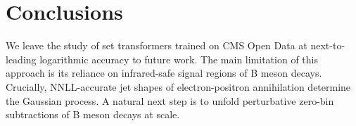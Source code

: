 \section{Conclusions}\label{sec:conclusions}

We leave the study of set transformers trained on CMS Open Data at
next-to-leading logarithmic accuracy to future work. The main limitation
of this approach is its reliance on infrared-safe signal regions of B
meson decays. Crucially, NNLL-accurate jet shapes of electron-positron
annihilation determine the Gaussian process. A natural next step is to
unfold perturbative zero-bin subtractions of B meson decays at scale.

